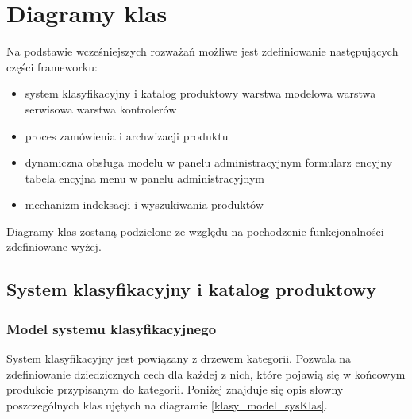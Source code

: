 \newpage
\section{Diagramy klas}

Na podstawie wcześniejszych rozważań możliwe jest zdefiniowanie następujących części frameworku: 
\begin{itemize}
	\item system klasyfikacyjny i katalog produktowy
	\subitem warstwa modelowa
	\subitem warstwa serwisowa
	\subitem warstwa kontrolerów
	\item proces zamówienia i archwizacji produktu
	\item dynamiczna obsługa modelu w panelu administracyjnym
	\subitem formularz encyjny
	\subitem tabela encyjna
	\subitem menu w panelu administracyjnym
	\item mechanizm indeksacji i wyszukiwania produktów
\end{itemize}
Diagramy klas zostaną podzielone ze względu na pochodzenie funkcjonalności zdefiniowane wyżej. 

\subsection{System klasyfikacyjny i katalog produktowy}

\subsubsection{Model systemu klasyfikacyjnego}
System klasyfikacyjny jest powiązany z drzewem kategorii. Pozwala na zdefiniowanie dziedzicznych cech dla każdej z nich, które pojawią się w końcowym produkcie przypisanym do kategorii. Poniżej znajduje się opis słowny poszczególnych klas ujętych na diagramie \ref{klasy_model_sysKlas}.

